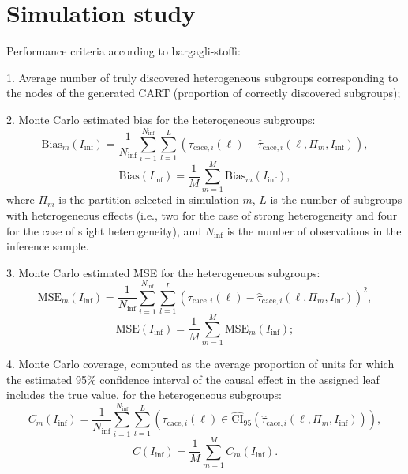 \chapter{Simulation study}


Performance criteria according to bargagli-stoffi: 

1. Average number of truly discovered heterogeneous subgroups corresponding to the nodes of the generated CART (proportion of correctly discovered subgroups);

2. Monte Carlo estimated bias for the heterogeneous subgroups:
\begin{equation}
\text{Bias}_m(I_\text{inf}) = \frac{1}{N_\text{inf}} \sum_{i=1}^{N_\text{inf}} \sum_{l=1}^{L} \left( \tau_{\text{cace},i}(\ell) - \hat{\tau}_{\text{cace},i}(\ell, \Pi_m, I_\text{inf}) \right),
\end{equation}
\begin{equation}
\text{Bias}(I_\text{inf}) = \frac{1}{M} \sum_{m=1}^{M} \text{Bias}_m(I_\text{inf}),
\end{equation}
where $\Pi_m$ is the partition selected in simulation $m$, $L$ is the number of subgroups with heterogeneous effects (i.e., two for the case of strong heterogeneity and four for the case of slight heterogeneity), and $N_\text{inf}$ is the number of observations in the inference sample.

3. Monte Carlo estimated MSE for the heterogeneous subgroups:
\begin{equation}
\text{MSE}_m(I_\text{inf}) = \frac{1}{N_\text{inf}} \sum_{i=1}^{N_\text{inf}} \sum_{l=1}^{L} \left( \tau_{\text{cace},i}(\ell) - \hat{\tau}_{\text{cace},i}(\ell, \Pi_m, I_\text{inf}) \right)^2,
\end{equation}
\begin{equation}
\text{MSE}(I_\text{inf}) = \frac{1}{M} \sum_{m=1}^{M} \text{MSE}_m(I_\text{inf});
\end{equation}

4. Monte Carlo coverage, computed as the average proportion of units for which the estimated 95\% confidence interval of the causal effect in the assigned leaf includes the true value, for the heterogeneous subgroups:
\begin{equation}
C_m(I_\text{inf}) = \frac{1}{N_\text{inf}} \sum_{i=1}^{N_\text{inf}} \sum_{l=1}^{L} \left( \tau_{\text{cace},i}(\ell) \in \hat{\text{CI}}_{95} \left( \hat{\tau}_{\text{cace},i}(\ell, \Pi_m, I_\text{inf}) \right) \right),
\end{equation}
\begin{equation}
C(I_\text{inf}) = \frac{1}{M} \sum_{m=1}^{M} C_m(I_\text{inf}).
\end{equation}

